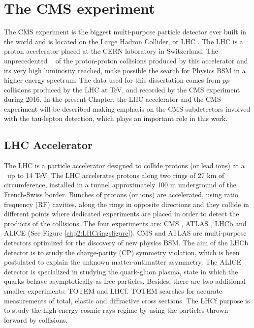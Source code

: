 \chapter[Experimental Setup]{The CMS experiment}
\label{chap:CMSExp}
The CMS experiment is the biggest multi-purpose particle detector
ever built in the world and  is located on the Large Hadron Collider, or LHC \cite{chp2:LHCTDR}. The LHC is a proton accelerator placed at the CERN 
laboratory in Switzerland. The unprecedented \centermassenergy~
of the proton-proton collisions produced by this accelerator and its 
very high luminosity reached, make possible the search
for Physics BSM in a higher energy spectrum. The data used for this dissertation comes from
$pp$ collisions produced by the LHC at  TeV, and recorded by the CMS experiment during 2016.
In the present Chapter, the LHC accelerator and the CMS experiment will be
described making emphasis on the CMS subdetectors involved with the 
tau-lepton detection, which plays an important role in this work. 


\section{LHC Accelerator}
\label{sec:LHC}
The LHC is a particle accelerator designed to collide protons (or lead ions) at a \centermassenergy~up to 14 TeV. The 
LHC accelerates protons along two rings of 27 km of circumference, installed in a tunnel 
approximately 100 m underground of the French-Swiss border. Bunches of protons (or ions)
are accelerated, using ratio frequency (RF) cavities, along the rings in opposite directions and they collide in 
different points where dedicated experiments are placed in order to detect the products of the collisions. The four experiments
are: CMS \cite{chp2:CMSTDR,chp2:CMSTDR2}, ATLAS \cite{chp2:ATLASTDR}, LHCb \cite{chp2:LHCb} and  ALICE \cite{chp2:ALICETDR} (See Figure \ref{chp2:LHCringsfigure}). CMS 
and ATLAS are multi-purpose detectors optimized for the discovery of new physics BSM. The aim of the LHCb detector is to study 
the charge-parity (CP) symmetry violation, which is been postulated to explain the unknown matter-antimatter 
asymmetry. The ALICE detector is specialized in studying the quark-gluon plasma, state in 
which the quarks behave asymptotically as free particles. Besides, there are two additional smaller 
experiments: TOTEM and LHCf. TOTEM searches for accurate measurements of total, elastic and diffractive
cross sections. The LHCf purpose is to study the high energy cosmic rays regime by using the particles thrown forward by collisions.

